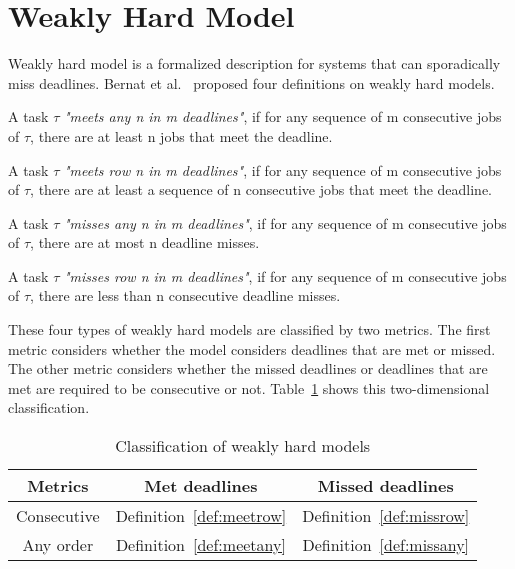 \section{Weakly Hard Model} \label{model}

Weakly hard model is a formalized description for systems that can sporadically miss deadlines. Bernat et al.~\cite{bernat2001weakly} proposed four definitions on weakly hard models. 

\begin{definition} \label{def:meetany}
A task $\tau$ \emph{"meets any n in m deadlines"}, if for any sequence of m consecutive jobs of $\tau$, there are at least n jobs that meet the deadline.
\end{definition}

\begin{definition} \label{def:meetrow}
 A task $\tau$ \emph{"meets row n in m deadlines"}, if for any sequence of m consecutive jobs of $\tau$, there are at least a sequence of n consecutive jobs that meet the deadline.
\end{definition}

\begin{definition} \label{def:missany}
 A task $\tau$ \emph{"misses any n in m deadlines"}, if for any sequence of m consecutive jobs of $\tau$, there are at most n deadline misses.
 \end{definition}
 
 \begin{definition} \label{def:missrow}
 A task $\tau$ \emph{"misses row n in m deadlines"}, if for any sequence of m consecutive jobs of $\tau$, there are less than n consecutive deadline misses.
 \end{definition}
 
 These four types of weakly hard models are classified by two metrics. The first metric considers whether the model considers deadlines that are met or missed. The other metric considers whether the missed deadlines or deadlines that are met are required to be consecutive or not. Table~\ref{table:1} shows this two-dimensional classification. 

\begin{table}[h!]
\caption{Classification of weakly hard models}
 \begin{center}
 \begin{tabular}{| c | c c |} 
 \hline
 Metrics & Met deadlines & Missed deadlines\\ [0.5ex] 
 \hline
 Consecutive & Definition~\ref{def:meetrow} & Definition~\ref{def:missrow} \\ 
Any order & Definition~\ref{def:meetany} & Definition~\ref{def:missany} \\ 
 \hline
\end{tabular}
\label{table:1}
\end{center}
 \end{table}

